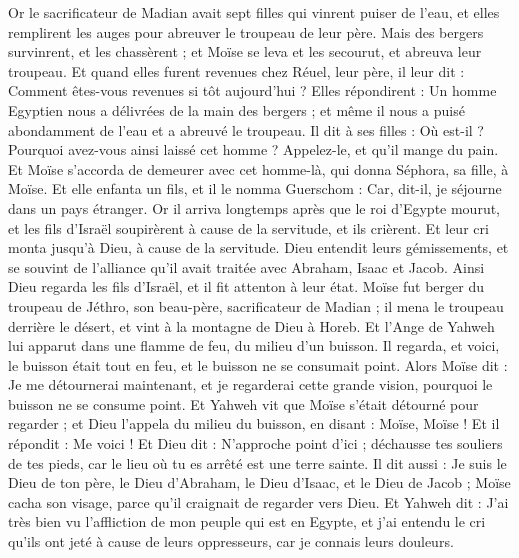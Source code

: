 \begin{multicols}{2}
Or le sacrificateur de Madian avait sept filles qui vinrent puiser de l'eau, et elles remplirent les auges pour abreuver le troupeau de leur père.
Mais des bergers survinrent, et les chassèrent ; et Moïse se leva et les secourut, et abreuva leur troupeau.
Et quand elles furent revenues chez Réuel, leur père, il leur dit : Comment êtes-vous revenues si tôt aujourd'hui ?
Elles répondirent : Un homme Egyptien nous a délivrées de la main des bergers ; et même il nous a puisé abondamment de l'eau et a abreuvé le troupeau.
Il dit à ses filles : Où est-il ? Pourquoi avez-vous ainsi laissé cet homme ? Appelez-le, et qu'il mange du pain.
Et Moïse s'accorda de demeurer avec cet homme-là, qui donna Séphora, sa fille, à Moïse.
Et elle enfanta un fils, et il le nomma  Guerschom :  Car, dit-il, je séjourne dans un pays étranger.
Or il arriva longtemps après que le roi d'Egypte mourut, et les fils d'Israël soupirèrent à cause de la servitude, et ils crièrent. Et leur cri monta jusqu'à Dieu, à cause de la servitude.
Dieu entendit leurs gémissements, et se souvint de l'alliance qu'il avait traitée avec Abraham, Isaac et Jacob.
Ainsi Dieu regarda les fils d'Israël, et il fit attenton à leur état.
\VerseOne{}Moïse fut berger du troupeau de Jéthro, son beau-père, sacrificateur de Madian ; il mena le troupeau derrière le désert, et vint à la montagne de Dieu à Horeb.
Et l'Ange de Yahweh lui apparut dans une flamme de feu, du milieu d'un buisson. Il regarda, et voici, le buisson était tout en feu, et le buisson ne se consumait point.
Alors Moïse dit : Je me détournerai maintenant, et je regarderai cette grande vision, pourquoi le buisson ne se consume point.
Et Yahweh vit que Moïse s'était détourné pour regarder ; et Dieu l'appela du milieu du buisson, en disant : Moïse, Moïse ! Et il répondit : Me voici !
Et Dieu dit : N'approche point d'ici ; déchausse tes souliers de tes pieds, car le lieu où tu es arrêté est une terre sainte.
Il dit aussi : Je suis le Dieu de ton père, le Dieu d'Abraham, le Dieu d'Isaac, et le Dieu de Jacob ; Moïse cacha son visage, parce qu'il craignait de regarder vers Dieu.
 Et Yahweh dit : J'ai très bien vu l'affliction de mon peuple qui est en Egypte, et j'ai entendu le cri qu'ils ont jeté à cause de leurs oppresseurs, car je connais leurs douleurs.

\end{multicols}
